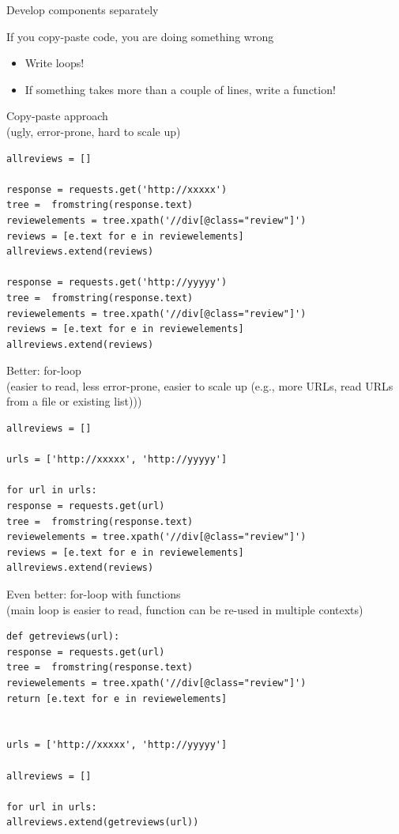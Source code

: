 \documentclass[handout]{beamer}
\begin{document}
\begin{frame}{Develop components separately}
\begin{block}{If you copy-paste code, you are doing something wrong}
\begin{itemize}[<+->]
\item Write loops!
\item If something takes more than a couple of lines, write a function!
\end{itemize}
\end{block}
\end{frame}

\begin{frame}
Copy-paste approach\\ (ugly, error-prone, hard to scale up)
\begin{lstlisting}
allreviews = []

response = requests.get('http://xxxxx')
tree =  fromstring(response.text)
reviewelements = tree.xpath('//div[@class="review"]')
reviews = [e.text for e in reviewelements]
allreviews.extend(reviews)

response = requests.get('http://yyyyy')
tree =  fromstring(response.text)
reviewelements = tree.xpath('//div[@class="review"]')
reviews = [e.text for e in reviewelements]
allreviews.extend(reviews)
\end{lstlisting}
\end{frame}


\begin{frame}
Better: for-loop\\ (easier to read, less error-prone, easier to scale up (e.g., more URLs, read URLs from a file or existing list)))
\begin{lstlisting}
allreviews = []

urls = ['http://xxxxx', 'http://yyyyy']

for url in urls:
response = requests.get(url)
tree =  fromstring(response.text)
reviewelements = tree.xpath('//div[@class="review"]')
reviews = [e.text for e in reviewelements]
allreviews.extend(reviews)
\end{lstlisting}
\end{frame}




\begin{frame}
Even better: for-loop with functions\\ (main loop is easier to read, function can be re-used in multiple contexts)
\begin{lstlisting}
def getreviews(url):
response = requests.get(url)
tree =  fromstring(response.text)
reviewelements = tree.xpath('//div[@class="review"]')
return [e.text for e in reviewelements]


urls = ['http://xxxxx', 'http://yyyyy']

allreviews = []

for url in urls:
allreviews.extend(getreviews(url))
\end{lstlisting}
\end{frame}
\end{document}
